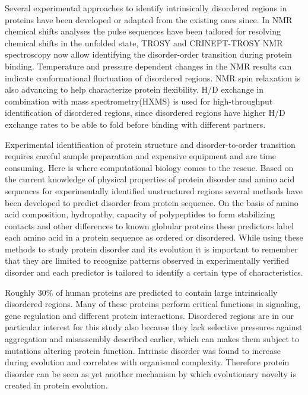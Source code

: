 \documentclass[11pt, a4paper,oneside]{report}
\begin{document}
Several experimental approaches to identify intrinsically disordered regions in proteins have been developed or adapted from the existing ones since. In NMR chemical shifts analyses the pulse sequences have been tailored for resolving chemical shifts in the unfolded state, TROSY and CRINEPT-TROSY NMR spectroscopy now allow identifying the disorder-order transition during protein binding. Temperature and pressure dependent changes in the NMR results can indicate conformational fluctuation of disordered regions. NMR spin relaxation is also advancing to help characterize protein flexibility. H/D exchange in combination with mass spectrometry(HXMS) is used for high-throughput identification of disordered regions, since disordered regions have higher H/D exchange rates to be able to fold before binding with different partners\cite{Balasubramaniam2013}.  

Experimental identification of protein structure and disorder-to-order transition requires careful sample preparation and expensive equipment and are time consuming.  Here is where computational biology comes to the rescue. Based on the current knowledge of physical properties of protein disorder and amino acid sequences for experimentally identified unstructured regions several methods have been developed to predict disorder from protein sequence. On the basis of amino acid composition, hydropathy, capacity of polypeptides to form stabilizing contacts and other differences to known globular proteins these predictors label each amino acid in a protein sequence as ordered or disordered. While using these methods to study protein disorder and its evolution it is important to remember that they are limited to recognize patterns observed in experimentally verified disorder and each predictor is tailored to identify a certain type of characteristics\cite{Dunker2011}.

Roughly 30\% of human proteins are predicted to contain large intrinsically disordered regions. Many of these proteins perform critical functions in signaling, gene regulation and different protein interactions\cite{Iakoucheva2002}. Disordered regions are in our particular interest for this study also because they lack selective pressures against aggregation and misassembly described earlier, which can makes them subject to mutations altering protein function.  Intrinsic disorder was found to increase during evolution and correlates with organismal complexity\cite{Schlessinger2011,Xue2012}. Therefore protein disorder can be seen as yet another mechanism by which evolutionary novelty is created in protein evolution.  
\end{document}
